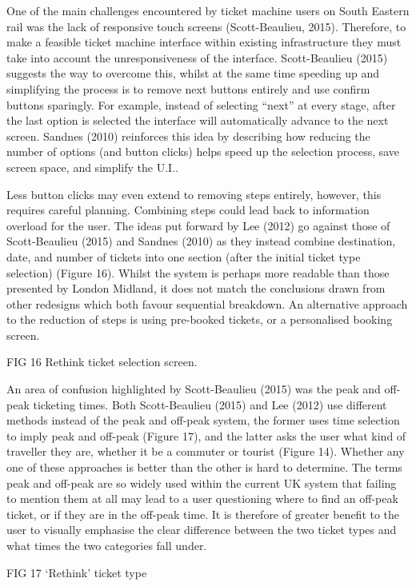 One of the main challenges encountered by ticket machine users on South Eastern rail was the lack of responsive touch screens (Scott-Beaulieu, 2015). Therefore, to make a feasible ticket machine interface within existing infrastructure they must take into account the unresponsiveness of the interface. Scott-Beaulieu (2015) suggests the way to overcome this, whilst at the same time speeding up and simplifying the process is to remove next buttons entirely and use confirm buttons sparingly. For example, instead of selecting ``next'' at every stage, after the last option is selected the interface will automatically advance to the next screen. Sandnes (2010) reinforces this idea by describing how reducing the number of options (and button clicks) helps speed up the selection process, save screen space, and simplify the U.I..

Less button clicks may even extend to removing steps entirely,  however, this requires careful planning. Combining steps could lead back to information overload for the user. The ideas put forward by Lee (2012) go against those of Scott-Beaulieu (2015) and Sandnes (2010) as they instead combine destination, date, and number of tickets into one section (after the initial ticket type selection) (Figure 16). Whilst the system is perhaps more readable than those presented by London Midland, it does not match the conclusions drawn from other redesigns which both favour sequential breakdown. An alternative approach to the reduction of steps is using pre-booked tickets, or a personalised booking screen.

FIG 16 Rethink ticket selection screen.

An area of confusion highlighted by Scott-Beaulieu (2015)  was the peak and off-peak ticketing times. Both Scott-Beaulieu (2015) and Lee (2012) use different methods instead of the peak and off-peak system, the former uses time selection to imply peak and off-peak (Figure 17), and the latter asks the user what kind of traveller they are, whether it be a commuter or tourist (Figure 14). Whether any one of these approaches is better than the other is hard to determine. The terms peak and off-peak are so widely used within the current UK system that failing to mention them at all may lead to a user questioning where to find an off-peak ticket, or if they are in the off-peak time. It is therefore of greater benefit to the user to visually emphasise the clear difference between the two ticket types and what times the two categories fall under.

FIG 17 ‘Rethink’ ticket type	

